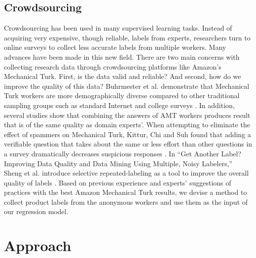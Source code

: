 \documentclass[dvips,12pt]{article}
\begin{document}
\subsection{Crowdsourcing}
Crowdsourcing has been used in many supervised learning tasks. Instead of acquiring very expensive, though reliable, labels from experts, researchers turn to online surveys to collect less accurate labels from multiple workers. Many advances have been made in this new field. 
There are two main concerns with collecting research data through crowdsourcing platforms like Amazon's Mechanical Turk. First, is the data valid and reliable? And second, how do we improve the quality of this data? 
Buhrmester et al. demonstrate that Mechanical Turk workers are more demographically diverse compared to other traditional sampling groups such as standard Internet and college surveys \cite{buhrmester2011amazon}. In addition, several studies show that combining the answers of AMT workers produces result that is of the same quality as domain experts'. 
When attempting to eliminate the effect of spammers on Mechanical Turk, Kittur, Chi and Suh found that adding a verifiable question that takes about the same or less effort than other questions in a survey dramatically decreases suspicious responses \cite{kittur2008crowdsourcing}. In “Get Another Label? Improving Data Quality and Data Mining Using Multiple, Noisy Labelers,” Sheng et al. introduce selective repeated-labeling as a tool to improve the overall quality of labels \cite{sheng2008get}.
Based on previous experience and experts’ suggestions of practices with the best Amazon Mechanical Turk results, we devise a method to collect product labels from the anonymous workers and use them as the input of our regression model.


\section{Approach}
\end{document}
